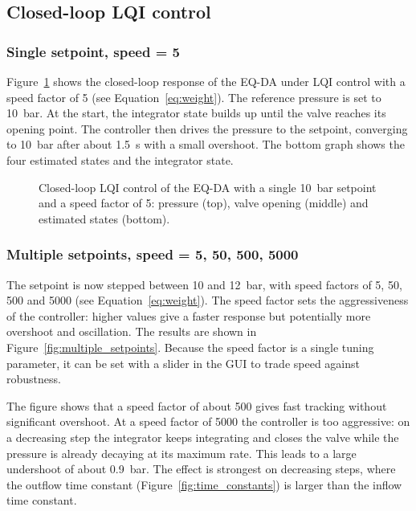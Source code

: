\documentclass[12pt,a4paper]{article}
\begin{document}
\newpage
\subsection{Closed-loop LQI control}
\subsubsection{Single setpoint, speed = 5}
Figure~\ref{fig:single_setpoint} shows the closed-loop response of the EQ-DA under LQI control with a speed factor of 5 (see Equation~\eqref{eq:weight}). The reference pressure is set to 10~bar. At the start, the integrator state builds up until the valve reaches its opening point. The controller then drives the pressure to the setpoint, converging to 10~bar after about 1.5~s with a small overshoot. The bottom graph shows the four estimated states and the integrator state.
\begin{figure}[ht!]
    \centering
    
    \caption{Closed-loop LQI control of the EQ-DA with a single 10~bar setpoint and a speed factor of 5: pressure (top), valve opening (middle) and estimated states (bottom).}
    \label{fig:single_setpoint}
\end{figure}

\clearpage
\subsubsection{Multiple setpoints, speed = 5, 50, 500, 5000}
The setpoint is now stepped between 10 and 12~bar, with speed factors of 5, 50, 500 and 5000 (see Equation~\eqref{eq:weight}). The speed factor sets the aggressiveness of the controller: higher values give a faster response but potentially more overshoot and oscillation. The results are shown in Figure~\ref{fig:multiple_setpoints}. Because the speed factor is a single tuning parameter, it can be set with a slider in the GUI to trade speed against robustness.

The figure shows that a speed factor of about 500 gives fast tracking without significant overshoot. At a speed factor of 5000 the controller is too aggressive: on a decreasing step the integrator keeps integrating and closes the valve while the pressure is already decaying at its maximum rate. This leads to a large undershoot of about 0.9~bar. The effect is strongest on decreasing steps, where the outflow time constant (Figure~\ref{fig:time_constants}) is larger than the inflow time constant.
\end{document}
